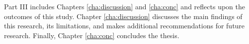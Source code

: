 Part III includes Chapters \ref{cha:discussion} and \ref{cha:conc} 
and reflects upon the outcomes of this study.
Chapter \ref{cha:discussion} discusses the main 
findings of this research, its limitations, and makes additional recommendations for future research.
Finally, Chapter \ref{cha:conc} concludes the thesis.

